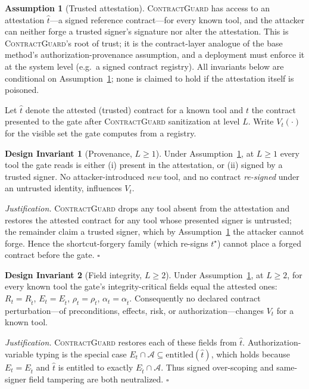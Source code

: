 \documentclass[conference,onecolumn]{IEEEtran}
\theoremstyle{definition}
\newtheorem{invariant}{Design Invariant}
\newtheorem{assumption}{Assumption}
\newcommand{\cg}{\textsc{ContractGuard}}
\newcommand{\Vt}{V_t}
\begin{document}
\begin{assumption}[Trusted attestation]
\label{asm:attest}
\cg{} has access to an attestation $\hat t$---a signed reference contract---for
every known tool, and the attacker can neither forge a trusted signer's signature
nor alter the attestation. This is \cg's root of trust; it is the contract-layer
analogue of the base method's authorization-provenance assumption, and a
deployment must enforce it at the system level (e.g.\ a signed contract
registry). All invariants below are conditional on Assumption~\ref{asm:attest};
none is claimed to hold if the attestation itself is poisoned.
\end{assumption}

\noindent Let $\hat t$ denote the attested (trusted) contract for a known tool and
$t$ the contract presented to the gate after \cg{} sanitization at level $L$.
Write $\Vt(\cdot)$ for the visible set the gate computes from a registry.

\begin{invariant}[Provenance, $L\geq 1$]
\label{prop:prov}
Under Assumption~\ref{asm:attest}, at $L\geq 1$ every tool the gate reads is
either (i) present in the attestation, or (ii) signed by a trusted signer. No
attacker-introduced \emph{new} tool, and no contract \emph{re-signed} under an
untrusted identity, influences $\Vt$.
\end{invariant}
\noindent\emph{Justification.} \cg{} drops any tool absent from the attestation and
restores the attested contract for any tool whose presented signer is untrusted;
the remainder claim a trusted signer, which by Assumption~\ref{asm:attest} the
attacker cannot forge. Hence the shortcut-forgery family (which re-signs
$t^\star$) cannot place a forged contract before the gate. $\square$

\begin{invariant}[Field integrity, $L\geq 2$]
\label{prop:field}
Under Assumption~\ref{asm:attest}, at $L\geq 2$, for every known tool the gate's
integrity-critical fields equal the attested ones: $R_t=R_{\hat t}$,
$E_t=E_{\hat t}$, $\rho_t=\rho_{\hat t}$, $\alpha_t=\alpha_{\hat t}$. Consequently
no declared contract perturbation---of preconditions, effects, risk, or
authorization---changes $\Vt$ for a known tool.
\end{invariant}
\noindent\emph{Justification.} \cg{} restores each of these fields from $\hat t$.
Authorization-variable typing is the special case $E_t\cap\mathcal{A}\subseteq
\mathrm{entitled}(\hat t)$, which holds because $E_t=E_{\hat t}$ and $\hat t$ is
entitled to exactly $E_{\hat t}\cap\mathcal{A}$. Thus signed over-scoping and
same-signer field tampering are both neutralized. $\square$
\end{document}
